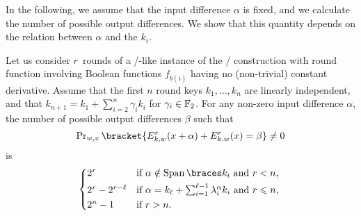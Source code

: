 In the following, we assume that the input difference $\alpha$ is fixed, and we calculate the number of possible output differences.
We show that this quantity depends on the relation between $\alpha$ and the $k_i$.

\begin{lemma}\label{bison:lem:number_diffs}
    Let us consider $r$~rounds of  a \bison/-like instance of the \WSN/ construction with round function involving Boolean functions $f_{b(i)}$ having no (non-trivial) constant derivative.
    Assume that the first $n$ round keys $k_1, \dots, k_n$ are linearly independent, and that $k_{n+1}=k_1 + \sum_{i=2}^n \gamma_i k_i$ for $\gamma_i \in \mathbb{F}_2$.
    For any non-zero input difference $\alpha$, the number of possible output differences $\beta$ such that
    \begin{equation*}
        \Prob_{w,x}\bracket{E_{k,w}^r(x+\alpha) + E_{k,w}^r(x)=\beta} \neq 0
    \end{equation*}
    is
    \begin{equation*}
        \begin{cases*}
            2^r              & if $\alpha \notin \Span{k_i}$ and $r < n$, \\
            2^r - 2^{r-\ell} & if $\alpha = k_\ell + \sum_{i=1}^{\ell-1} \lambda_i^\alpha k_i$ and $r \leqslant n$, \\
            2^n-1            & if $r >n$.
        \end{cases*}
    \end{equation*}
\end{lemma}
